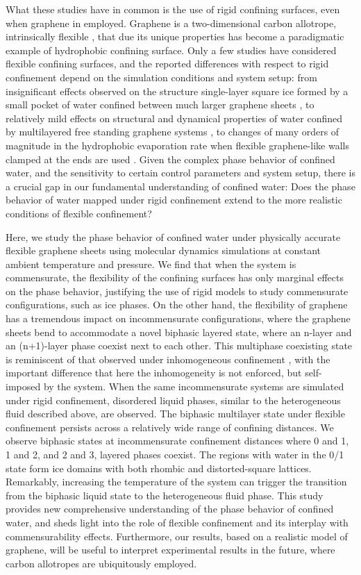 \documentclass[12pt]{article}
\begin{document}
What these studies have in common is the use of rigid confining surfaces, even when graphene in employed. Graphene is a two-dimensional carbon allotrope, intrinsically flexible \cite{Wei2013,Fasolino2007}, that due its unique properties \cite{Geim2007} has become a paradigmatic example of hydrophobic confining surface. Only a few studies have considered flexible confining surfaces, and the reported differences with respect to rigid confinement depend on the simulation conditions and system setup: from insignificant effects observed on the structure single-layer square ice formed by a small pocket of water confined between much larger graphene sheets \cite{Algara-Siller2015}, to relatively mild effects on structural and dynamical properties of water confined by multilayered free standing graphene systems \cite{Deshmukh2014}, to changes of many orders of magnitude in the hydrophobic evaporation rate when flexible graphene-like walls clamped at the ends are used \cite{Altabet2017}. Given the complex phase behavior of confined water, and the sensitivity to certain control parameters and system setup, there is a crucial gap in our fundamental understanding of confined water: Does the phase behavior of water mapped under rigid confinement extend to the more realistic conditions of flexible confinement?

Here, we study the phase behavior of confined water under physically accurate flexible graphene sheets using molecular dynamics simulations at constant ambient temperature and pressure. We find that when the system is commensurate, the flexibility of the confining surfaces has only marginal effects on the phase behavior, justifying the use of rigid models to study commensurate configurations, such as ice phases. On the other hand, the flexibility of graphene has a tremendous impact on incommensurate configurations, where the graphene sheets bend to accommodate a novel biphasic layered state, where an n-layer and an (n+1)-layer phase coexist next to each other. This multiphase coexisting state is reminiscent of that observed under inhomogeneous confinement \cite{Qiu2015}, with the important difference that here the inhomogeneity is not enforced, but self-imposed by the system. When the same incommensurate systems are simulated under rigid confinement, disordered liquid phases, similar to the heterogeneous fluid described above, are observed. The biphasic multilayer state under flexible confinement persists across a relatively wide range of confining distances. We observe biphasic states at incommensurate confinement distances where 0 and 1, 1 and 2, and 2 and 3, layered phases coexist. The regions with water in the 0/1 state form ice domains with both rhombic and distorted-square lattices. Remarkably, increasing the temperature of the system can trigger the transition from the biphasic liquid state to the heterogeneous fluid phase. This study provides new comprehensive understanding of the phase behavior of confined water, and sheds light into the role of flexible confinement and its interplay with commensurability effects. Furthermore, our results, based on a realistic model of graphene, will be useful to interpret experimental results in the future, where carbon allotropes are ubiquitously employed.
\end{document}
